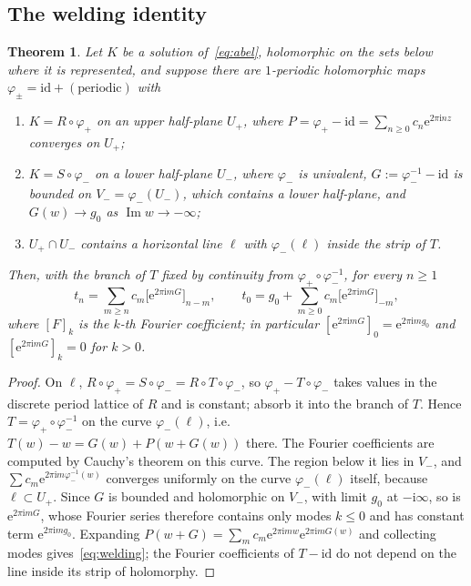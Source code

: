 \documentclass[11pt,a4paper]{article}
\newtheorem{theorem}{Theorem}
\theoremstyle{definition}
\newcommand{\Rr}{R}
\newcommand{\Kk}{K}
\newcommand{\eee}{\mathrm{e}}
\newcommand{\ii}{\mathrm{i}}
\begin{document}
\subsection{The welding identity}

\begin{theorem}\label{thm:welding}
Let $\Kk$ be a solution of~\eqref{eq:abel}, holomorphic on the sets below
where it is represented, and suppose there are
$1$-periodic holomorphic maps $\varphi_\pm=\mathrm{id}+(\text{periodic})$ with
\begin{enumerate}
\item $\Kk=\Rr\circ\varphi_+$ on an upper half-plane $U_+$, where
  $P=\varphi_+-\mathrm{id}=\sum_{n\ge0}c_n\eee^{2\pi\ii nz}$ converges on $U_+$;
\item $\Kk=S\circ\varphi_-$ on a lower half-plane $U_-$, where $\varphi_-$ is
  univalent, $G:=\varphi_-^{-1}-\mathrm{id}$ is bounded on
  $V_-=\varphi_-(U_-)$, which contains a lower half-plane, and
  $G(w)\to g_0$ as $\operatorname{Im}w\to-\infty$;
\item $U_+\cap U_-$ contains a horizontal line $\ell$ with $\varphi_-(\ell)$
  inside the strip of $T$.
\end{enumerate}
Then, with the branch of $T$ fixed by continuity from $\varphi_+\circ\varphi_-^{-1}$,
for every $n\ge1$
\begin{equation}\label{eq:welding}
 t_n=\sum_{m\ge n}c_m\bigl[\eee^{2\pi\ii mG}\bigr]_{n-m},\qquad
 t_0=g_0+\sum_{m\ge0}c_m\bigl[\eee^{2\pi\ii mG}\bigr]_{-m},
\end{equation}
where $[F]_k$ is the $k$-th Fourier coefficient; in particular
$[\eee^{2\pi\ii mG}]_0=\eee^{2\pi\ii mg_0}$ and $[\eee^{2\pi\ii mG}]_k=0$ for $k>0$.
\end{theorem}

\begin{proof}
On $\ell$, $\Rr\circ\varphi_+=S\circ\varphi_-=\Rr\circ T\circ\varphi_-$, so
$\varphi_+-T\circ\varphi_-$ takes values in the discrete period lattice of
$\Rr$ and is constant; absorb it into the branch of $T$.  Hence
$T=\varphi_+\circ\varphi_-^{-1}$ on the curve $\varphi_-(\ell)$, i.e.\
$T(w)-w=G(w)+P(w+G(w))$ there.  The Fourier coefficients are computed by
Cauchy's theorem on this curve.  The region below it lies in $V_-$, and
$\sum c_m\eee^{2\pi\ii m\varphi_-^{-1}(w)}$ converges uniformly on the curve
$\varphi_-(\ell)$ itself, because $\ell\subset U_+$.  Since $G$ is bounded and holomorphic on $V_-$, with
limit $g_0$ at $-\ii\infty$, so is $\eee^{2\pi\ii mG}$, whose Fourier series
therefore contains only modes $k\le0$ and has constant term
$\eee^{2\pi\ii mg_0}$.  Expanding
$P(w+G)=\sum_mc_m\eee^{2\pi\ii mw}\eee^{2\pi\ii mG(w)}$ and collecting modes
gives~\eqref{eq:welding}; the Fourier coefficients of $T-\mathrm{id}$ do not depend
on the line inside its strip of holomorphy.
\end{proof}
\end{document}
